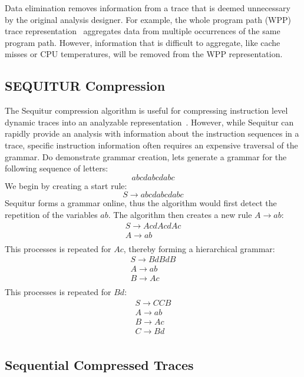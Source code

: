 {Data elimination removes information from a trace that is deemed unnecessary by the original analysis designer.  For example, the whole program path (WPP) trace representation~\cite{larus:99:pldi} aggregates data from multiple occurrences of the same program path.  However, information that is difficult to aggregate, like cache misses or CPU temperatures, will be removed from the WPP representation.

\subsection{SEQUITUR Compression}

The Sequitur compression algorithm is useful for compressing instruction level dynamic traces into an analyzable representation~\cite{manning:97:dcc}.  However, while Sequitur can rapidly provide an analysis with information about the instruction sequences in a trace, specific instruction information often requires an expensive traversal of the grammar.  Do demonstrate grammar creation, lets generate a grammar for the following sequence of letters: $$ abcdabcdabc $$ We begin by creating a start rule: $$ S \rightarrow abcdabcdabc $$ Sequitur forms a grammar online, thus the algorithm would first detect the repetition of the variables $ab$.  The algorithm then creates a new rule $A \rightarrow ab$: $$ \begin{array}{lcll} S \rightarrow AcdAcdAc\\ A \rightarrow ab\\ \end{array} $$ This processes is repeated for $Ac$, thereby forming a hierarchical grammar: $$ \begin{array}{lcll} S \rightarrow BdBdB\\ A \rightarrow ab\\ B \rightarrow Ac\\ \end{array} $$ This processes is repeated for $Bd$: $$ \begin{array}{lcll} S \rightarrow CCB\\ A \rightarrow ab\\ B \rightarrow Ac\\ C \rightarrow Bd\\ \end{array} $$

\subsection{Sequential Compressed Traces}

}
